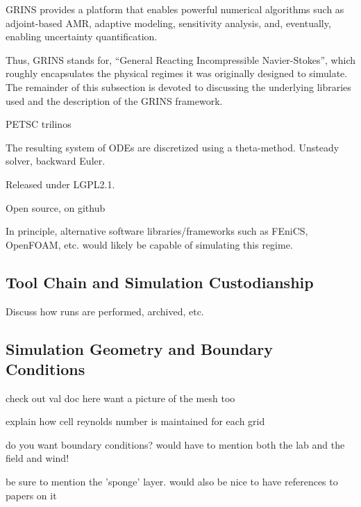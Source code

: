 GRINS provides a platform that enables powerful numerical algorithms
such as adjoint-based AMR, adaptive modeling, sensitivity analysis,
and, eventually, enabling uncertainty quantification.

Thus, GRINS stands for, ``General Reacting Incompressible Navier-Stokes'',
which roughly encapsulates the physical regimes it was originally
designed to simulate. The remainder of this subsection is devoted to
discussing the underlying libraries used and the description of the
GRINS framework.  

PETSC\cite{petsc} trilinos\cite{trilinos}

The resulting system of ODEs are discretized using a theta-method. 
Unsteady solver, backward Euler. 

Released under LGPL2.1\cite{lgpl}. 



Open source, on github\cite{github}

In principle, alternative software libraries/frameworks such as
FEniCS\cite{fenics}, OpenFOAM\cite{openfoam}, etc. would likely be
capable of simulating this regime. 


\subsection{Tool Chain and Simulation Custodianship}

Discuss how runs are performed, archived, etc. 

\subsection{Simulation Geometry and Boundary Conditions}

check out val doc here
want a picture of the mesh too

explain how cell reynolds number is maintained for each grid

do you want boundary conditions? would have to mention both the lab and
the field and wind!

be sure to mention the 'sponge' layer. would also be nice to have references to papers on it
